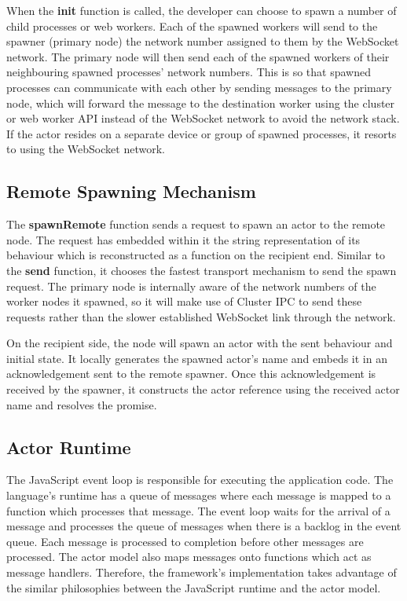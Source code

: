 \documentclass[oneside]{um-fict}
\begin{document}
When the \textbf{init} function is called, the developer can choose to spawn a number of child processes or web workers. Each of the spawned workers will send to the spawner (primary node) the network number assigned to them by the WebSocket network. The primary node will then send each of the spawned workers of their neighbouring spawned processes' network numbers. This is so that spawned processes can communicate with each other by sending messages to the primary node, which will forward the message to the destination worker using the cluster or web worker API instead of the WebSocket network to avoid the network stack. If the actor resides on a separate device or group of spawned processes, it resorts to using the WebSocket network.
\subsection{Remote Spawning Mechanism}
The \textbf{spawnRemote} function sends a request to spawn an actor to the remote node. The request has embedded within it the string representation of its behaviour which is reconstructed as a function on the recipient end. Similar to the \textbf{send} function, it chooses the fastest transport mechanism to send the spawn request. The primary node is internally aware of the network numbers of the worker nodes it spawned, so it will make use of Cluster IPC to send these requests rather than the slower established WebSocket link through the network.

On the recipient side, the node will spawn an actor with the sent behaviour and initial state. It locally generates the spawned actor's name and embeds it in an acknowledgement sent to the remote spawner. Once this acknowledgement is received by the spawner, it constructs the actor reference using the received actor name and resolves the promise.

\subsection{Actor Runtime}
The JavaScript event loop is responsible for executing the application code. The language's runtime has a queue of messages where each message is mapped to a function which processes that message. The event loop waits for the arrival of a message and processes the queue of messages when there is a backlog in the event queue. Each message is processed to completion before other messages are processed. The actor model also maps messages onto functions which act as message handlers. Therefore, the framework's implementation takes advantage of the similar philosophies between the JavaScript runtime and the actor model.
\end{document}
